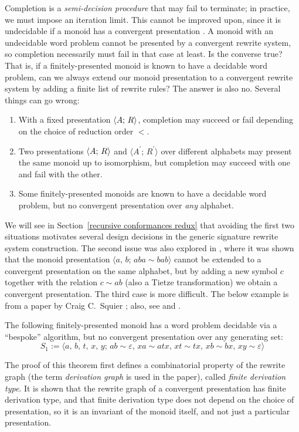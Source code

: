 \documentclass[../generics]{subfiles}
\begin{document}
Completion is a \emph{semi-decision procedure} that may fail to terminate; in practice, we must impose an iteration limit. This cannot be improved upon, since it is undecidable if a monoid has a convergent presentation \cite{ODUNLAING1983339}. A monoid with an undecidable word problem cannot be presented by a convergent rewrite system, so completion necessarily must fail in that case at least. Is the converse true? That is, if a finitely-presented monoid is known to have a decidable word problem, can we always extend our monoid presentation to a convergent rewrite system by adding a finite list of rewrite rules? The answer is also no. Several things can go wrong:
\begin{enumerate}
\item With a fixed presentation $\langle A;\,R\rangle$, completion may succeed or fail depending on the choice of reduction order $<$.
\item Two presentations $\langle A;\,R\rangle$ and $\langle A^\prime;\,R^\prime\rangle$ over different alphabets may present the same monoid up to isomorphism, but completion may succeed with one and fail with the other.
\item Some finitely-presented monoids are known to have a decidable word problem, but no convergent presentation over \emph{any} alphabet.
\end{enumerate}
We will see in Section~\ref{recursive conformances redux} that avoiding the first two situations motivates several design decisions in the generic signature rewrite system construction. The second issue was also explored in \cite{KAPUR1985337}, where it was shown that the monoid presentation $\langle a,\,b;\,aba\sim bab\rangle$ cannot be extended to a convergent presentation on the same alphabet, but by adding a new symbol $c$ together with the relation $c\sim ab$ (also a Tietze transformation) we obtain a convergent presentation. The third case is more difficult. The below example is from a paper by Craig C.~Squier \cite{SQUIER1994271}; also, see \cite{Lafont1991ChurchRooserPA} and \cite{LAFONT1995229}.
\begin{theorem}\label{squier s1} The following finitely-presented monoid has a word problem decidable via a ``bespoke'' algorithm, but no convergent presentation over any generating set:
\[S_1:=\langle a,\,b,\,t,\,x,\,y;\,ab\sim \varepsilon,\,xa\sim atx,\,xt\sim tx,\,xb\sim bx,\,xy\sim \varepsilon\rangle\]
\end{theorem}
The proof of this theorem first defines a combinatorial property of the rewrite graph (the term \emph{derivation graph} is used in the paper), called \emph{finite derivation type}. It is shown that the rewrite graph of a convergent presentation has finite derivation type, and that finite derivation type does not depend on the choice of presentation, so it is an invariant of the monoid itself, and not just a particular presentation.
\end{document}
